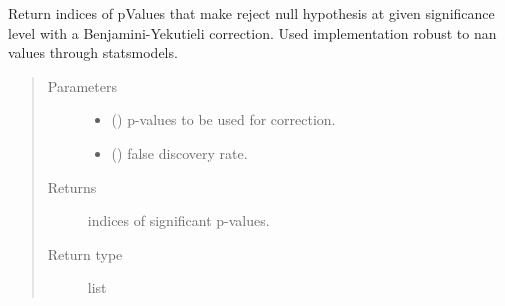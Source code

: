 \documentclass[letterpaper,10pt,english]{sphinxmanual}
\begin{document}
\begin{fulllineitems}
\label{\detokenize{_modules/cosifer.utils:cosifer.utils.stats.benjamini_yekutieli_correction}}
Return indices of pValues that make reject null hypothesis
at given significance level with a Benjamini-Yekutieli correction.
Used implementation robust to nan values through statsmodels.
\begin{quote}\begin{description}
\item[{Parameters}] \leavevmode\begin{itemize}
\item {} 
 () \textendash{} p-values to be used for correction.

\item {} 
 () \textendash{} false discovery rate.

\end{itemize}

\item[{Returns}] \leavevmode
indices of significant p-values.

\item[{Return type}] \leavevmode
list

\end{description}\end{quote}

\end{fulllineitems}

\end{document}
